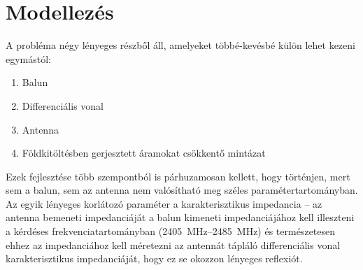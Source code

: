 \chapter{Modellezés}
A probléma négy lényeges részből áll, amelyeket többé-kevésbé külön lehet kezeni egymástól:
\begin{enumerate}
	\item Balun
	\item Differenciális vonal
	\item Antenna
	\item Földkitöltésben gerjesztett áramokat csökkentő mintázat
\end{enumerate}
\par Ezek fejlesztése több szempontból is párhuzamosan kellett, hogy történjen, mert sem a balun, sem az antenna nem valósítható meg széles paramétertartományban. Az egyik lényeges korlátozó paraméter a karakterisztikus impedancia -- az antenna bemeneti impedanciáját a balun kimeneti impedanciájához kell illeszteni a kérdéses frekvenciatartományban (\SIrange{2405}{2485}{MHz}) és természetesen ehhez az impedanciához kell méretezni az antennát tápláló differenciális vonal karakterisztikus impedanciáját, hogy ez se okozzon lényeges reflexiót.
